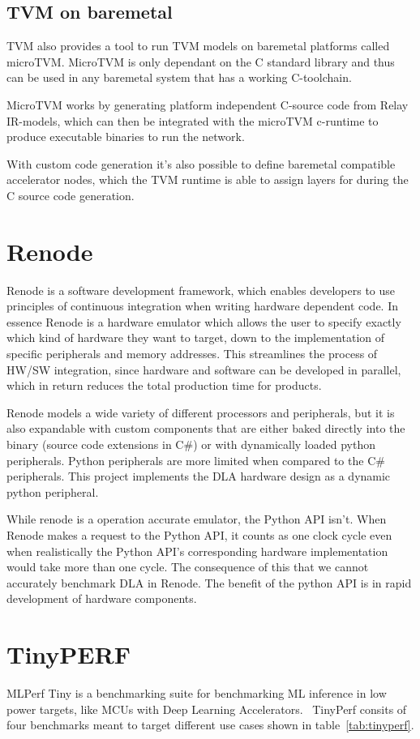 \documentclass[12pt,a4paper,english
]{tunithesis}
\begin{document}
\subsection{TVM on baremetal}
TVM also provides a tool to run TVM models on baremetal platforms called microTVM. MicroTVM is only dependant on the C standard library and thus can be used in any baremetal system that has a working C-toolchain.

MicroTVM works by generating platform independent C-source code from Relay IR-models, which can then be integrated with the microTVM c-runtime to produce executable binaries to run the network.

With custom code generation it's also possible to define baremetal compatible accelerator nodes, which the TVM runtime is able to assign layers for during the C source code generation.~\parencite{TVM}


\section{Renode}
\label{sec:renode}
Renode is a software development framework, which enables developers to use principles of continuous integration when writing hardware dependent code. In essence Renode is a hardware emulator which allows the user to specify exactly which kind of hardware they want to target, down to the implementation of specific peripherals and memory addresses. This streamlines the process of HW/SW integration, since hardware and software can be developed in parallel, which in return reduces the total production time for products.

Renode models a wide variety of different processors and peripherals, but it is also expandable with custom components that are either baked directly into the binary (source code extensions in C\#) or with dynamically loaded python peripherals. Python peripherals are more limited when compared to the C\# peripherals. This project implements the DLA hardware design as a dynamic python peripheral.

While renode is a operation accurate emulator, the Python API isn't. When Renode makes a request to the Python API, it counts as one clock cycle even when realistically the Python API's corresponding hardware implementation would take more than one cycle. The consequence of this that we cannot accurately benchmark DLA in Renode. The benefit of the python API is in rapid development of hardware components.


\section{TinyPERF}
MLPerf Tiny is a benchmarking suite for benchmarking ML inference in low power targets, like MCUs with Deep Learning Accelerators.~\parencite{tinyperf}
TinyPerf consits of four benchmarks meant to target different use cases shown in table~\ref{tab:tinyperf}.
\end{document}
